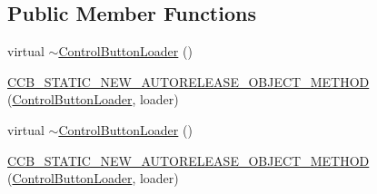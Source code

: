\subsection*{Public Member Functions}
\begin{DoxyCompactItemize}
\item 
virtual \hyperlink{classcocosbuilder_1_1ControlButtonLoader_af233929bcb65b00911c14b948e23a7a6}{$\sim$\+Control\+Button\+Loader} ()
\item 
\hyperlink{classcocosbuilder_1_1ControlButtonLoader_a9bff9a5cc58026ee53afe00dbebbe946}{C\+C\+B\+\_\+\+S\+T\+A\+T\+I\+C\+\_\+\+N\+E\+W\+\_\+\+A\+U\+T\+O\+R\+E\+L\+E\+A\+S\+E\+\_\+\+O\+B\+J\+E\+C\+T\+\_\+\+M\+E\+T\+H\+OD} (\hyperlink{classcocosbuilder_1_1ControlButtonLoader}{Control\+Button\+Loader}, loader)
\item 
virtual \hyperlink{classcocosbuilder_1_1ControlButtonLoader_af233929bcb65b00911c14b948e23a7a6}{$\sim$\+Control\+Button\+Loader} ()
\item 
\hyperlink{classcocosbuilder_1_1ControlButtonLoader_a9bff9a5cc58026ee53afe00dbebbe946}{C\+C\+B\+\_\+\+S\+T\+A\+T\+I\+C\+\_\+\+N\+E\+W\+\_\+\+A\+U\+T\+O\+R\+E\+L\+E\+A\+S\+E\+\_\+\+O\+B\+J\+E\+C\+T\+\_\+\+M\+E\+T\+H\+OD} (\hyperlink{classcocosbuilder_1_1ControlButtonLoader}{Control\+Button\+Loader}, loader)
\end{DoxyCompactItemize}
